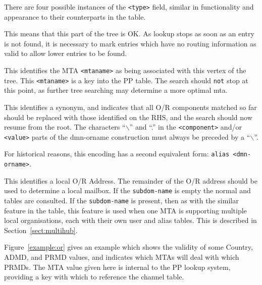 There are four possible instances of the \verb|<type>| field, similar
in functionality and appearance to their counterparts in the
 table.
\begin{describe}

\item[\verb+valid+:]
This means that this part of the tree is OK. As lookup stops as soon
as an entry is not found, it is necessary to mark entries which have
no routing information as valid to allow lower entries to be found.

\item [\verb+mta <mtaname>+:]
This identifies the MTA \verb|<mtaname>| as being associated with this
vertex of the tree.  This \verb|<mtaname>| is a key into the PP 
table.  The search should \verb|not| stop at this point, as further tree
searching may determine a more optimal mta.

\item [\verb+synonym <dmn-orname>+:]
This identifies a synonym, and indicates that all O/R components matched
so far should be replaced with those identified on the RHS, and the
search should now resume from the root.
The characters ``$\backslash$'' and ``.''  in the \verb|<component>|
and/or \verb|<value>| parts of the dmn-orname construction must always
be preceded by a ``$\backslash$''.

For historical reasons, this encoding has a second equivalent form:
\verb+alias <dmn-orname>+.

\item [\protect{\verb+local [<subdom-name>]+}:]
This identifies a local O/R Address.  The remainder of the O/R address
should be used to determine a local mailbox.  If the
\verb|subdom-name| is empty the normal  and  tables are
consulted. If the \verb|subdom-name| is present, then as with the
similar feature in the  table, this feature is used when one MTA
is supporting multiple local organisations, each with their own user
and alias tables.  This is described in Section~\ref{sect:multihub}.

\end{describe}

Figure~\ref{example:or} gives an example which shows the validity of
some Country, ADMD, and PRMD values, and indicates which MTAs will
deal with which PRMDs.  The MTA value given here is internal to the PP
lookup system, providing a key with which to reference the
channel table.


